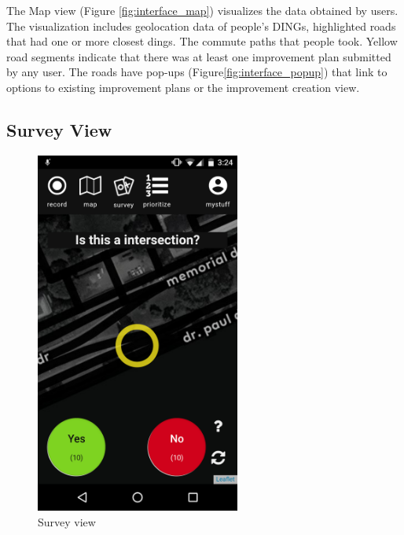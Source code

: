 The Map view (Figure \ref{fig:interface_map}) visualizes the data obtained by users.
The visualization includes geolocation data of people's DINGs, highlighted
roads that had one or more closest dings. The commute paths that people
took. Yellow road segments indicate that there was at least one improvement
plan submitted by any user. The roads have pop-ups (Figure\ref{fig:interface_popup}) that link to options to
existing improvement plans or the improvement creation view.





\subsection{Survey View}

\begin{figure}[htb]
  \includegraphics[width=0.6\textwidth]{chapters/4/fig/interface_survey.png}               
  \caption[interface: Survey]{Survey view}
  \label{fig:interface_survey}
\end{figure}

